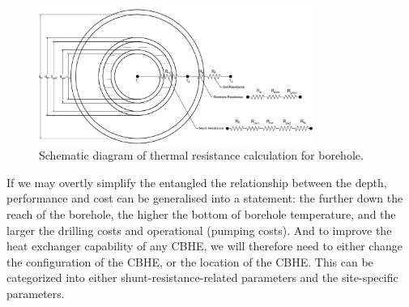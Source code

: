 		\begin{figure}[h!]
			\centering
			\includegraphics[width=0.8\textwidth]{data/CBHE_CrossSection}
			\caption{Schematic diagram of thermal resistance calculation for borehole.}\label{fg:cbhesec}
		\end{figure}
	
If we may overtly simplify the entangled the relationship between the depth, performance and cost can be generalised into a statement: the further down the reach of the borehole, the higher the bottom of borehole temperature, and the larger the drilling costs and operational (pumping costs). And to improve the heat exchanger capability of any CBHE, we will therefore need to either change the configuration of the CBHE, or the location of the CBHE. This can be categorized into either shunt-resistance-related parameters and the site-specific parameters. 



